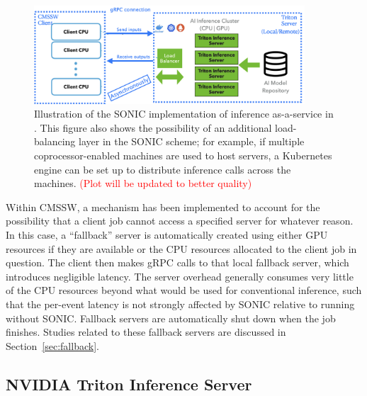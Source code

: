 \begin{figure}[htp]
    \centering
    \includegraphics[width=0.90\textwidth]{plots/Architecture.png}
    \caption{Illustration of the SONIC implementation of inference as-a-service in \CMSSW. This figure also shows the possibility of an additional load-balancing layer in the SONIC scheme; for example, if multiple coprocessor-enabled machines are used to host servers, a Kubernetes engine can be set up to distribute inference calls across the machines. \textcolor{red}{(Plot will be updated to better quality)}}
    \label{fig:architecture}
\end{figure}

Within CMSSW, a mechanism has been implemented to account for the possibility that a client job cannot access a specified server for whatever reason. In this case, a ``fallback'' server is automatically created using either GPU resources if they are available or the CPU resources allocated to the client job in question. The client then makes gRPC calls to that local fallback server, which introduces negligible latency. The server overhead generally consumes very little of the CPU resources beyond what would be used for conventional inference, such that the per-event latency is not strongly affected by SONIC relative to running without SONIC. Fallback servers are automatically shut down when the job finishes. Studies related to these fallback servers are discussed in Section~\ref{sec:fallback}.

\subsection{NVIDIA Triton Inference Server}
\label{sec:triton}

